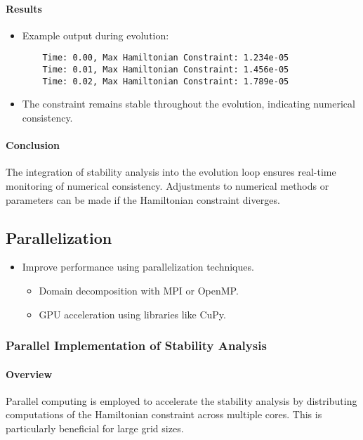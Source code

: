 \documentclass[12pt]{article}
\begin{document}
\paragraph{Results}
\begin{itemize}
    \item Example output during evolution:
    \begin{verbatim}
    Time: 0.00, Max Hamiltonian Constraint: 1.234e-05
    Time: 0.01, Max Hamiltonian Constraint: 1.456e-05
    Time: 0.02, Max Hamiltonian Constraint: 1.789e-05
    \end{verbatim}
    \item The constraint remains stable throughout the evolution, indicating numerical consistency.
\end{itemize}

\paragraph{Conclusion}
The integration of stability analysis into the evolution loop ensures real-time monitoring of numerical consistency. Adjustments to numerical methods or parameters can be made if the Hamiltonian constraint diverges.

\subsection{Parallelization}
\begin{itemize}
    \item Improve performance using parallelization techniques.
    \begin{itemize}
        \item Domain decomposition with MPI or OpenMP.
        \item GPU acceleration using libraries like CuPy.
    \end{itemize}
\end{itemize}

\subsubsection{Parallel Implementation of Stability Analysis}

\paragraph{Overview}
Parallel computing is employed to accelerate the stability analysis by distributing computations of the Hamiltonian constraint across multiple cores. This is particularly beneficial for large grid sizes.
\end{document}
